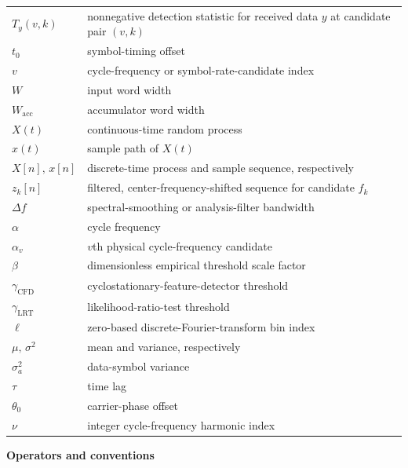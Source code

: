 \begin{longtable}{@{}L{0.23\textwidth}L{0.68\textwidth}@{}}
$T_y(v,k)$ & nonnegative detection statistic for received data $y$ at candidate pair $(v,k)$ \\
$t_0$ & symbol-timing offset \\
$v$ & cycle-frequency or symbol-rate-candidate index \\
$W$ & input word width \\
$W_{\mathrm{acc}}$ & accumulator word width \\
$X(t)$ & continuous-time random process \\
$x(t)$ & sample path of $X(t)$ \\
$X[n],\,x[n]$ & discrete-time process and sample sequence, respectively \\
$z_k[n]$ & filtered, center-frequency-shifted sequence for candidate $f_k$ \\
$\Delta f$ & spectral-smoothing or analysis-filter bandwidth \\
$\alpha$ & cycle frequency \\
$\alpha_v$ & $v$th physical cycle-frequency candidate \\
$\beta$ & dimensionless empirical threshold scale factor \\
$\gamma_{\mathrm{CFD}}$ & cyclostationary-feature-detector threshold \\
$\gamma_{\mathrm{LRT}}$ & likelihood-ratio-test threshold \\
$\ell$ & zero-based discrete-Fourier-transform bin index \\
$\mu,\,\sigma^2$ & mean and variance, respectively \\
$\sigma_a^2$ & data-symbol variance \\
$\tau$ & time lag \\
$\theta_0$ & carrier-phase offset \\
$\nu$ & integer cycle-frequency harmonic index \\
\end{longtable}

\noindent\textbf{Operators and conventions}
\medskip

